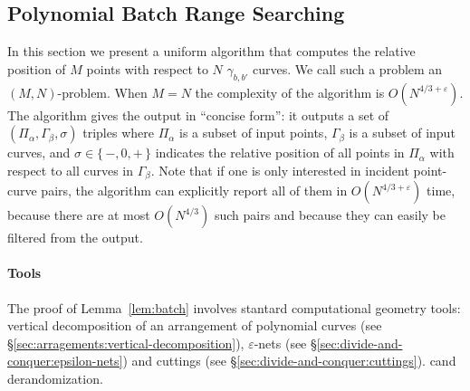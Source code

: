 \subsection{Polynomial Batch Range Searching}%
\label{sec:algo:point-curves-location}

In this section we present a uniform algorithm that computes the relative
position of \(M\) points with respect to \(N\) $\gamma_{b,b'}$ curves. We call
such a problem an \((M,N)\)-problem. When \(M=N\) the complexity of the
algorithm is \(O(N^{4/3+\varepsilon})\).
The algorithm gives the output in ``concise form'':
it outputs a set of $(\Pi_\alpha, \Gamma_\beta, \sigma)$ triples where
$\Pi_\alpha$ is a subset of input points, $\Gamma_\beta$ is a subset of input curves, and $\sigma \in
\{\,-,0,+\,\}$ indicates the relative position of all points in $\Pi_\alpha$ with
respect to all curves in $\Gamma_\beta$.
Note that if one is only interested in incident point-curve pairs, the
algorithm can explicitly report all of them in
$O(N^{4/3+\varepsilon})$ time, because there are at most $O(N^{4/3})$
such pairs and because they can easily be filtered from the output.

\paragraph{Tools} The proof of Lemma~\ref{lem:batch} involves stantard
computational geometry tools: vertical decomposition of an
arrangement of polynomial curves (see
\S\ref{sec:arragements:vertical-decomposition}),
$\varepsilon$-nets (see \S\ref{sec:divide-and-conquer:epsilon-nets})
and cuttings (see \S\ref{sec:divide-and-conquer:cuttings}).
cand derandomization.

